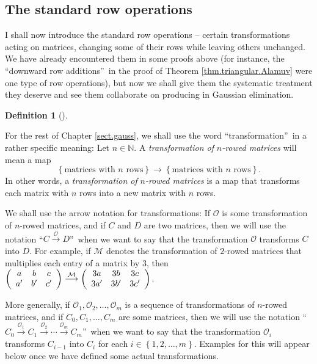 \documentclass[numbers=enddot,12pt,final,onecolumn,notitlepage]{scrartcl}%
\theoremstyle{definition}
\newtheorem{defi}[theo]{Definition}
\newenvironment{definition}[1][]
{\begin{defi}[#1]\begin{leftbar}}
{\end{leftbar}\end{defi}}
\begin{document}
\subsection{The standard row operations}

I shall now introduce the standard row operations -- certain transformations
acting on matrices, changing some of their rows while leaving others
unchanged. We have already encountered them in some proofs above (for
instance, the \textquotedblleft downward row additions\textquotedblright\ in
the proof of Theorem \ref{thm.triangular.Alamuv} were one type of row
operations), but now we shall give them the systematic treatment they deserve
and see them collaborate on producing in Gaussian elimination.

\begin{definition}
For the rest of Chapter \ref{sect.gauss}, we shall use the word
\textquotedblleft transformation\textquotedblright\ in a rather specific
meaning: Let $n\in\mathbb{N}$. A \textit{transformation of }$n$\textit{-rowed
matrices} will mean a map%
\[
\left\{  \text{matrices with }n\text{ rows}\right\}  \rightarrow\left\{
\text{matrices with }n\text{ rows}\right\}  .
\]
In other words, a \textit{transformation of }$n$\textit{-rowed matrices} is a
map that transforms each matrix with $n$ rows into a new matrix with $n$ rows.

We shall use the arrow notation for transformations: If $\mathcal{O}$ is some
transformation of $n$-rowed matrices, and if $C$ and $D$ are two matrices,
then we will use the notation \textquotedblleft$C\overset{\mathcal{O}%
}{\longrightarrow}D$\textquotedblright\ when we want to say that the
transformation $\mathcal{O}$ transforms $C$ into $D$. For example, if
$\mathcal{M}$ denotes the transformation of $2$-rowed matrices that multiplies
each entry of a matrix by $3$, then $\left(
\begin{array}
[c]{ccc}%
a & b & c\\
a^{\prime} & b^{\prime} & c^{\prime}%
\end{array}
\right)  \overset{\mathcal{M}}{\longrightarrow}\left(
\begin{array}
[c]{ccc}%
3a & 3b & 3c\\
3a^{\prime} & 3b^{\prime} & 3c^{\prime}%
\end{array}
\right)  $.

More generally, if $\mathcal{O}_{1},\mathcal{O}_{2},\ldots,\mathcal{O}_{m}$ is
a sequence of transformations of $n$-rowed matrices, and if $C_{0}%
,C_{1},\ldots,C_{m}$ are some matrices, then we will use the notation
\textquotedblleft$C_{0}\overset{\mathcal{O}_{1}}{\longrightarrow}%
C_{1}\overset{\mathcal{O}_{2}}{\longrightarrow}\cdots\overset{\mathcal{O}%
_{m}}{\longrightarrow}C_{m}$\textquotedblright\ when we want to say that the
transformation $\mathcal{O}_{i}$ transforms $C_{i-1}$ into $C_{i}$ for each
$i\in\left\{  1,2,\ldots,m\right\}  $. Examples for this will appear below
once we have defined some actual transformations.


\end{definition}
\end{document}
